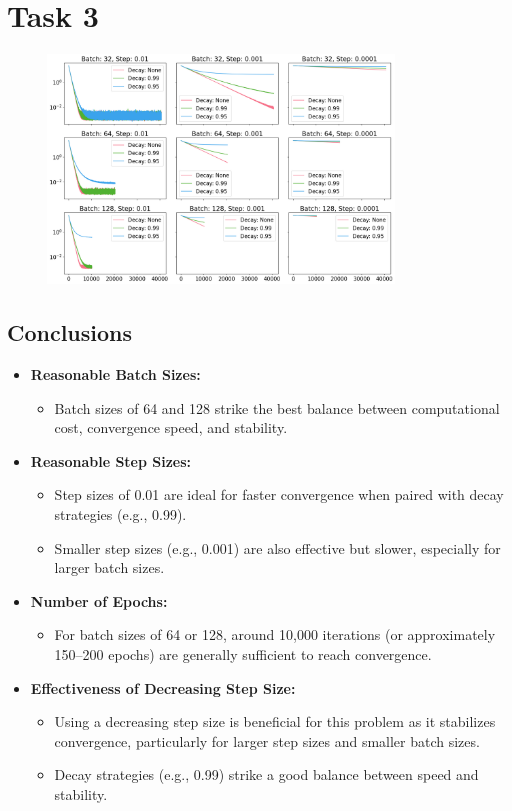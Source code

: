 \documentclass[12pt]{article}
\begin{document}
\section*{Task 3}

\begin{figure}[ht]
    \centering
    \includegraphics[width=0.82\textwidth]{./imgs/SGD.png}
\end{figure}


\subsection*{Conclusions}
\begin{itemize}
    \item \textbf{Reasonable Batch Sizes:}
    \begin{itemize}
        \item Batch sizes of 64 and 128 strike the best balance between computational cost, convergence speed, and stability.
    \end{itemize}
    \item \textbf{Reasonable Step Sizes:}
    \begin{itemize}
        \item Step sizes of 0.01 are ideal for faster convergence when paired with decay strategies (e.g., 0.99).
        \item Smaller step sizes (e.g., 0.001) are also effective but slower, especially for larger batch sizes.
    \end{itemize}
    \item \textbf{Number of Epochs:}
    \begin{itemize}
        \item For batch sizes of 64 or 128, around 10,000 iterations (or approximately 150–200 epochs) are generally sufficient to reach convergence.
    \end{itemize}
    \item \textbf{Effectiveness of Decreasing Step Size:}
    \begin{itemize}
        \item Using a decreasing step size is beneficial for this problem as it stabilizes convergence, particularly for larger step sizes and smaller batch sizes.
        \item Decay strategies (e.g., 0.99) strike a good balance between speed and stability.
    \end{itemize}
\end{itemize}
\end{document}
